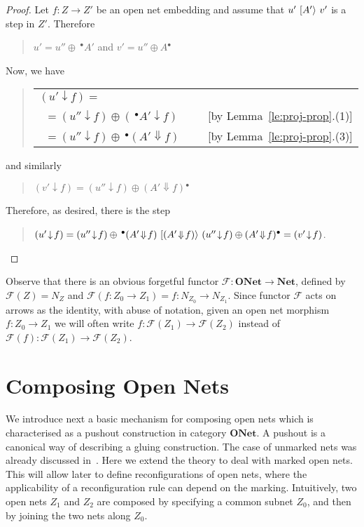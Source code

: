 \documentclass{LMCS}
\newcommand{\res}[2]{\ensuremath{({#1}\!\downarrow\!{#2})}}
\newcommand{\sres}[2]{\ensuremath{({#1}\!\Downarrow\!{#2})}}
\newcommand{\pre}[1][(\cdot)]{\ensuremath{\!~^\bullet{#1}}}
\newcommand{\post}[1][(\cdot)]{\ensuremath{{#1} {^\bullet}}}
\newcommand{\trans}[1]{\ensuremath{\ [\/{#1}\/\rangle}\ }
\newcommand{\onet}{\ensuremath{\mathbf{ONet}}}
\newcommand{\net}{\ensuremath{\mathbf{Net}}}
\newcommand{\fo}{\ensuremath{\mathcal{F}}}
\begin{document}
\begin{proof}
  Let $f: Z \to Z'$ be an open net embedding and assume that $u' \trans{A'}
  v'$ is a step in $Z'$. Therefore
  \begin{quote}
    $u' = u'' \oplus \pre[A']$ \quad and \quad $v' = u'' \oplus \post[A]$
  \end{quote}
Now, we have
  \begin{quote}
    \begin{tabular}{lll}
      $\res{u'}{f} =$ \\
      \ \quad $= \res{u''}{f} \oplus \res{\pre[A']}{f}$ & \ \quad &  [by Lemma~\ref{le:proj-prop}.(1)]\\
\ \quad $=  \res{u''}{f} \oplus \pre[\sres{A'}{f}]$ & &
      [by Lemma~\ref{le:proj-prop}.(3)]
    \end{tabular}
  \end{quote}
  and similarly
    \begin{quote}
      $\res{v'}{f} = \res{u''}{f} \oplus \post[\sres{A'}{f}]$
    \end{quote}
Therefore, as desired, there is the step
    \begin{quote}
      $\res{u'}{f} = \res{u''}{f} \oplus \pre[\sres{A'}{f}]
      \trans{\sres{A'}{f}} 
      \res{u''}{f} \oplus \post[\sres{A'}{f}] = \res{v'}{f}$.
    \end{quote}
\end{proof}


Observe that there is an obvious forgetful functor $\fo : \onet \to
\net$, defined by $\fo(Z) = N_Z$ and $\fo(f : Z_0 \to Z_1) = f :
N_{Z_0} \to N_{Z_1}$. Since functor $\fo$ acts on arrows as the identity,
with abuse of notation, given an open net morphism $f : Z_0 \to Z_1$
we will often write $f : \fo(Z_1) \to \fo(Z_2)$ instead of $\fo(f) :
\fo(Z_1) \to \fo(Z_2)$.



\section{Composing Open Nets}
\label{se:composing-nets}

We introduce next a basic mechanism for composing open nets which is
characterised as a pushout construction in category $\onet$. A pushout
is a canonical way of describing a gluing construction.
The case of unmarked nets was already discussed in~\cite{BCEH:CSOP}. Here we
extend the theory to deal with marked open nets. 
This will allow later to define reconfigurations of open nets, where
the applicability of a reconfiguration rule can depend on the marking.
Intuitively, two open nets $Z_1$ and $Z_2$ are composed by specifying a
common subnet $Z_0$, and then by joining the two nets along $Z_0$.
\end{document}
